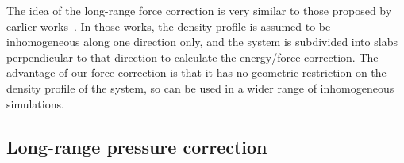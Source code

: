\documentclass[aps,pre,preprint]{revtex4-1}
\renewcommand{\v}[1]{\textbf{\textit{#1}}}
\begin{document}
The idea of the long-range force correction is very similar to those
proposed by earlier works~\cite{guo1997long, mecke1997molecular,
  janecek2006long, shen2007comparative}. In those works, the density
profile is assumed to be inhomogeneous along one direction only, and the
system is subdivided into slabs perpendicular to that direction to
calculate the energy/force correction. The advantage of our force
correction is that it has no geometric restriction on the density
profile of the system, so can be used in a wider range of
inhomogeneous simulations.





\subsection{Long-range pressure correction}

\end{document}
